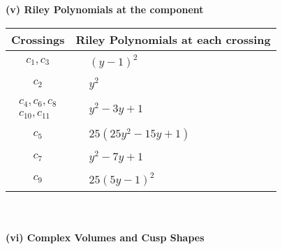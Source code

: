 \documentclass[1p]{elsarticle_modified}
\theoremstyle{definition}
\begin{document}
\newpage\renewcommand{\arraystretch}{1}
\flushleft \textbf{(v) Riley Polynomials at the component}\newline \\
\begin{tabular}{m{50pt}|m{274pt}}
Crossings & \hspace{64pt}Riley Polynomials at each crossing \\
\hline $$\begin{aligned}c_{1},c_{3}\end{aligned}$$&$\begin{aligned}
&(y-1)^2
\end{aligned}$\\
\hline $$\begin{aligned}c_{2}\end{aligned}$$&$\begin{aligned}
&y^2
\end{aligned}$\\
\hline $$\begin{aligned}c_{4},c_{6},c_{8}\\c_{10},c_{11}\end{aligned}$$&$\begin{aligned}
&y^2-3 y+1
\end{aligned}$\\
\hline $$\begin{aligned}c_{5}\end{aligned}$$&$\begin{aligned}
&25(25 y^2-15 y+1)
\end{aligned}$\\
\hline $$\begin{aligned}c_{7}\end{aligned}$$&$\begin{aligned}
&y^2-7 y+1
\end{aligned}$\\
\hline $$\begin{aligned}c_{9}\end{aligned}$$&$\begin{aligned}
&25(5 y-1)^2
\end{aligned}$\\
\hline
\end{tabular}\\~\\
\newpage\flushleft \textbf{(vi) Complex Volumes and Cusp Shapes}
\end{document}
